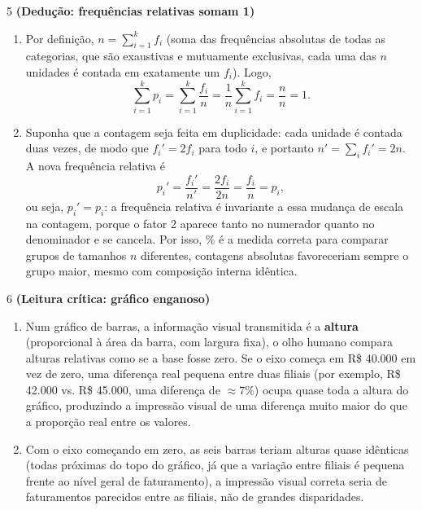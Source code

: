 \documentclass[11pt]{article}
\begin{document}
\begin{questao}{5} \textbf{(Dedução: frequências relativas somam 1)}
\begin{solucao}
\begin{enumerate}[label=(\alph*)]
  \item Por definição, $n = \sum_{i=1}^k f_i$ (soma das frequências absolutas de todas as
    categorias, que são exaustivas e mutuamente exclusivas, cada uma das $n$ unidades é contada
    em exatamente um $f_i$). Logo,
  $$
  \sum_{i=1}^k p_i = \sum_{i=1}^k \frac{f_i}{n} = \frac{1}{n}\sum_{i=1}^k f_i = \frac{n}{n} = 1.
  $$
  \item Suponha que a contagem seja feita em duplicidade: cada unidade é contada duas vezes, de
    modo que $f_i' = 2f_i$ para todo $i$, e portanto $n' = \sum_i f_i' = 2n$. A nova frequência
    relativa é
  $$
  p_i' = \frac{f_i'}{n'} = \frac{2f_i}{2n} = \frac{f_i}{n} = p_i,
  $$
  ou seja, $p_i'=p_i$: a frequência relativa é invariante a essa mudança de escala na contagem,
  porque o fator 2 aparece tanto no numerador quanto no denominador e se cancela. Por isso, \% é
  a medida correta para comparar grupos de tamanhos $n$ diferentes, contagens absolutas
  favoreceriam sempre o grupo maior, mesmo com composição interna idêntica.
\end{enumerate}
\end{solucao}
\end{questao}

\begin{questao}{6} \textbf{(Leitura crítica: gráfico enganoso)}
\begin{solucao}
\begin{enumerate}[label=(\alph*)]
  \item Num gráfico de barras, a informação visual transmitida é a \textbf{altura} (proporcional à área
    da barra, com largura fixa), o olho humano compara alturas relativas como se a base fosse
    zero. Se o eixo começa em R\$ 40.000 em vez de zero, uma diferença real pequena entre duas
    filiais (por exemplo, R\$ 42.000 vs. R\$ 45.000, uma diferença de $\approx 7\%$) ocupa quase
    toda a altura do gráfico, produzindo a impressão visual de uma diferença muito maior do que a
    proporção real entre os valores.
  \item Com o eixo começando em zero, as seis barras teriam alturas quase idênticas (todas
    próximas do topo do gráfico, já que a variação entre filiais é pequena frente ao nível geral
    de faturamento), a impressão visual correta seria de faturamentos parecidos entre as filiais,
    não de grandes disparidades.
\end{enumerate}
\end{solucao}
\end{questao}
\end{document}
